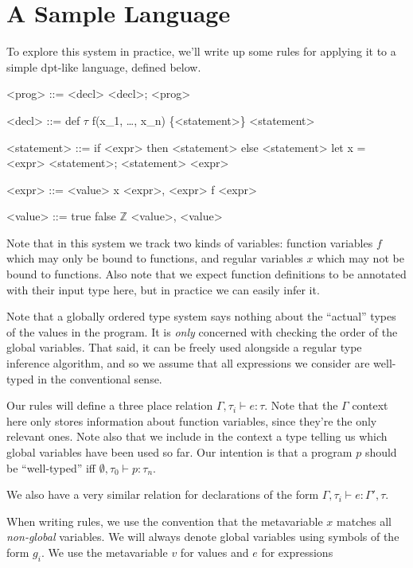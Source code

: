 \documentclass{article}
\newcommand{\Z}{\mathbb{Z}}
\newcommand{\Zt}{$\Z$}
\begin{document}
\section*{A Sample Language}
To explore this system in practice, we'll write up some rules for applying it to a simple dpt-like language, defined below.

\begin{grammar}
  <prog> ::= <decl> \alt <decl>; <prog>

  <decl> ::=
  def $\tau$ f(x_1, \dots, x_n) \{<statement>\}
  \alt <statement>

  <statement> ::=
  if <expr> then <statement> else <statement>
  \alt let x = <expr>
  \alt <statement>; <statement>
  \alt <expr>

  <expr> ::=
  <value>
  \alt x
  \alt <expr>, <expr>
  \alt f <expr>

  <value> ::=
  true \alt false \alt \Zt
  \alt <value>, <value>

\end{grammar}

Note that in this system we track two kinds of variables: function variables $f$ which may only be bound to functions, and regular variables $x$ which may not be bound to functions. Also note that we expect function definitions to be annotated with their input type here, but in practice we can easily infer it.

Note that a globally ordered type system says nothing about the ``actual'' types of the values in the program. It is \emph{only} concerned with checking the order of the global variables. That said, it can be freely used alongside a regular type inference algorithm, and so we assume that all expressions we consider are well-typed in the conventional sense.

Our rules will define a three place relation $\Gamma, \tau_i \vdash e \colon \tau$. Note that the $\Gamma$ context here only stores information about function variables, since they're the only relevant ones.
Note also that we include in the context a type telling us which global variables have been used so far. Our intention is that a program $p$ should be ``well-typed'' iff $\emptyset, \tau_0 \vdash p \colon \tau_n$.

We also have a very similar relation for declarations of the form $\Gamma, \tau_i \vdash e \colon \Gamma', \tau$.

When writing rules, we use the convention that the metavariable $x$ matches all \emph{non-global} variables. We will always denote global variables using symbols of the form $g_i$. We use the metavariable $v$ for values and $e$ for expressions
\end{document}
